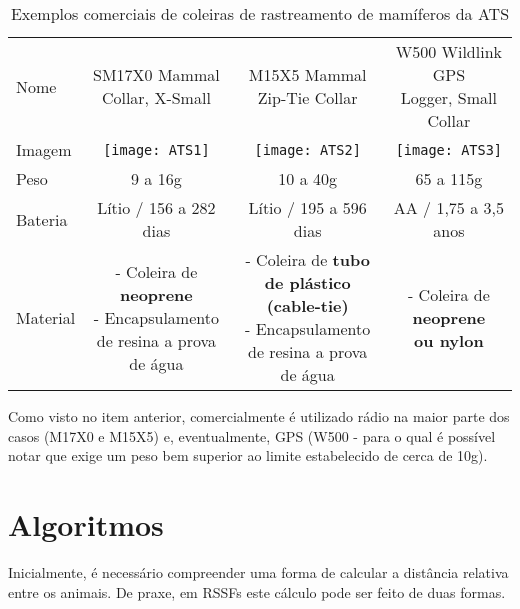 \begin{table}[ht]
\centering
\caption{Exemplos comerciais de coleiras de rastreamento de mamíferos da ATS}
\vspace{0.5cm}
\begin{tabular}{l|ccc}
\hline
Nome & \makecell{SM17X0 Mammal \\ Collar, X-Small} & \makecell{M15X5 Mammal \\ Zip-Tie Collar} & \makecell{W500 Wildlink GPS \\ Logger, Small Collar} \\
Imagem & \texttt{[image: ATS1]} & \texttt{[image: ATS2]} & \texttt{[image: ATS3]} \vspace{0.4cm}\\

Peso & 9 a 16g & 10 a 40g & 65 a 115g \vspace{0.4cm}\\

Bateria & Lítio / 156 a 282 dias & Lítio / 195 a 596 dias & AA / 1,75 a 3,5 anos \vspace{0.4cm} \\

Material & 
\makecell{- Coleira de \\ \textbf{neoprene} \\
- Encapsulamento \\ de resina a prova \\ de água} &
\makecell{ - Coleira de \textbf{tubo} \\ \textbf{de plástico (cable-tie)} \\
- Encapsulamento \\ de resina a prova \\ de água} &
\makecell{- Coleira de \textbf{neoprene} \\ \textbf{ou nylon} }   
\end{tabular}
\end{table}

Como visto no item anterior, comercialmente é utilizado rádio na maior parte dos casos (M17X0 e M15X5) e, eventualmente, GPS (W500 - para o qual é possível notar que exige um peso bem superior ao limite estabelecido de cerca de 10g).
\FloatBarrier

\section{Algoritmos}
Inicialmente, é necessário compreender uma forma de calcular a distância relativa entre os animais. De praxe, em RSSFs este cálculo pode ser feito de duas formas.

